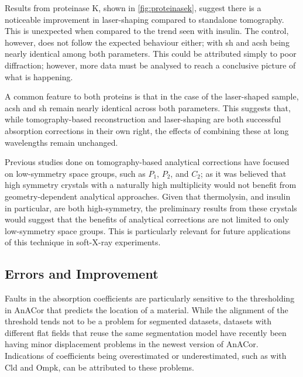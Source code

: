 Results from proteinase K, shown in \cref{fig:proteinasek}, suggest there is a noticeable improvement in laser-shaping compared to standalone tomography. This is unexpected when compared to the trend seen with insulin. The control, however, does not follow the expected behaviour either; with \ac{sh} and \ac{acsh} being nearly identical among both parameters. This could be attributed simply to poor diffraction; however, more data must be analysed to reach a conclusive picture of what is happening.

A common feature to both proteins is that in the case of the laser-shaped sample, \ac{acsh} and \ac{sh} remain nearly identical across both parameters.
This suggests that, while tomography-based reconstruction and laser-shaping are both successful absorption corrections in their own right, the effects of combining these at long wavelengths remain unchanged.

Previous studies done on tomography-based analytical corrections have focused on low-symmetry space groups, such as $P_1$, $P_2$, and $C_2$; as it was believed that high symmetry crystals with a naturally high multiplicity would not benefit from geometry-dependent analytical approaches. Given that thermolysin, and insulin in particular, are both high-symmetry, the preliminary results from these crystals would suggest that the benefits of analytical corrections are not limited to only low-symmetry space groups. This is particularly relevant for future applications of this technique in soft-X-ray experiments.





\subsection{Errors and Improvement}

Faults in the absorption coefficients are particularly sensitive to the thresholding in AnACor that predicts the location of a material. While the alignment of the threshold tends not to be a problem for segmented datasets, datasets with different flat fields that reuse the same segmentation model have recently been having minor displacement problems in the newest version of AnACor. Indications of coefficients being overestimated or underestimated, such as with Cld and Ompk, can be attributed to these problems.  

